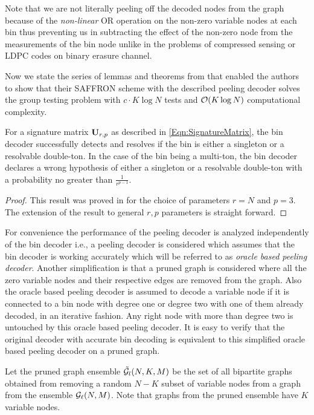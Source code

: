 \begin{remark}
 Note that we are not literally peeling off the decoded nodes from the graph because of the \textit{non-linear} OR operation on the non-zero variable nodes at each bin thus preventing us in subtracting the effect of the non-zero node from the measurements of the bin node unlike in the problems of compressed sensing or LDPC codes on binary erasure channel.
\end{remark}

Now we state the series of lemmas and theorems from \cite{lee2015saffron} that enabled the authors to show that their SAFFRON scheme with the described peeling decoder solves the group testing problem with $c\cdot K\log N$ tests and $\mathcal{O}(K\log N)$ computational complexity.

\begin{lemma}
\label{Lem:BinDecoderAnalysis}
For a signature matrix $\mathbf{U}_{r,p}$ as described in \eqref{Eqn:SignatureMatrix}, the bin decoder successfully detects and resolves if the bin is either a singleton or a resolvable double-ton. In the case of the bin being a multi-ton, the bin decoder declares a wrong hypothesis of either a singleton or a resolvable double-ton with a probability no greater than $\frac{1}{r^{p-1}}$.
\end{lemma}
\begin{proof}
This result was proved in \cite{lee2015saffron} for the choice of parameters $r=N$ and $p=3$. The extension of the result to general $r,p$ parameters is straight forward.
\end{proof}

For convenience the performance of the peeling decoder is analyzed independently of the bin decoder i.e., a peeling decoder is considered which assumes that the bin decoder is working accurately which will be referred to as \textit{oracle based peeling decoder}. Another simplification is that a pruned graph is considered where all the zero variable nodes and their respective edges are removed from the graph. Also the oracle based peeling decoder is assumed to decode a variable node if it is connected to a bin node with degree one or degree two with one of them already decoded, in an iterative fashion. Any right node with more than degree two is untouched by this oracle based peeling decoder. It is easy to verify that the original decoder with accurate bin decoding is equivalent to this simplified oracle based peeling decoder on a pruned graph.
\begin{definition}
Let the pruned graph ensemble $\tilde{\mathcal{G}}_l(N,K,M)$ be the set of all bipartite graphs obtained from removing a random $N-K$ subset of variable nodes from a graph from the ensemble $\mathcal{G}_{\ell}(N,M)$. Note that graphs from the pruned ensemble have $K$ variable nodes. 
\end{definition}	

